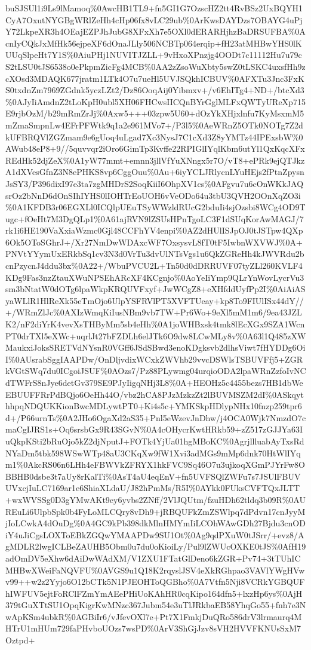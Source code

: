 \documentclass[]{article}
\begin{document}
buSJSUl1i9Ls9lMamoq\%0AwcHB1TL9+fn5GI1G7OzscHZ2tt4RvBSz2UxBQYH1CyA7OxutNYGBgWRlZeHh4cHp06fx8vLC29ub\%0ArKwsDAYDzs7OBAYG4uPjY72LkpeXR3h4OEajEZPJhJubG8XFxXh7e5OXl0dERARHjhzBaDRSUFBA\%0AcnIyCQkJxMfHk56ejpeXF6dOnaJLly506NCBTp064erqip+fH23atMHBwYHS0lKUUqSlpeHt7Y1S\%0AiuPHj1NUVITJZLL+9vHxoXPnzjg4OODt7c11112Hu7u79cS2tLSU0tJS6538o0ePkpmZicFg4MCB\%0AA2zZsoWuXbty5swZ0tLSKC4uxsfHh9zcXOsd3MDAQK677jratm1LTk4O7u7ueHl5UVJSQkhICBUV\%0AFXTu3Jnc3FxKS0txdnZm7969ZGdnk5yczLZt2/Dz86OoqAij0Yibmxv+/v6EhITg4+ND+/btcXd3\%0AJyIiAmdnZ2tLoKpH0ubl5XH06FHCwsIICQnBYrGglMLFxQWTyUReXp715E9rjbOzM/b29mRmZrJj\%0Axw5+++03zpw5U60+dOzYkXHjxlnfu7KyMsxmM5mZmaSmpnLw4EFrPFWtk9q1a2e961MVo7+/P3l5\%0AeWRnZ5OTk0NOTg7Z2dkUFBRQVlZGZmam9e6gUoq4uLgad7Xc3NysJ7C1cXd3Z8yYMTz44IPExsbW\%0AWub48eP8+9//5quvvqr2iOro6GimTp3Kvffe22RPIGlIYqlKbm6utYl1QxKqcXFxREdHk52djZeX\%0A1yW77mmt+emnn3jllVfYuXNngx5r7O/vT8+ePRk9ejQTJkzA1dXVesGfnZ3N8ePHKS8vp6CggOuu\%0Au+6iyYCLJRlycnLYuHEjs2fPtnZpysnJsSY3/P396dixI97e3ta7zgMHDrS2SoqKiiI6OhpXV1cs\%0AFgvu7u6cOnWKkJAQsrOz2bNnD6dOnSIhIYHS0lIOHTrEoUOH6vVeODo64u3tbU3QVH2OOnXqZO3i\%0A1KFDB3r06EGXLl0ICQlpUEuTSyWWzldRUcG2bduIi4sjOzsbi8WCg4OD9Tugc+fOeHt7M3DgQLp1\%0A61ajRVN9lZSUsHPnTgoLC3F1dSUqKorAwMAGJ/7rk1i6HE190VaXxiaWzmc0Gjl48CCFhYV4enpi\%0AZ2dHUlISJpOJ0tJSTpw4QXp6Ok5OToSGhrJ+/Xr27NmDwWDAxcWF7OxsysvL8fT0tF5IwbnWXVWJ\%0A+PNVtYYymUxERkbSq1cv3N3d0VrTu3dvUlNTsVgs1u6QkZGReHh4kJWVRdu2bcnPzycnJ4ddu3bx\%0A22+/WbuPVCU2L+Tn50d0dDRRUVF07tyZLl260KVLF4KDg9Fas3nzZtauXWuNPSEhARcXF4KCgnjo\%0AoYeIiYmp9QLrYnWovLycrVu3sm3bNtatW0dOTg6lpaWkpKRQUVFxyf+JwWCgZ8+eXHfddUyfPp2I\%0AiAiASyaWLlR1HlReXk55eTmOjo6UlpYSFRVlPT5XVFTUeay+kp8To9FIUlISx44dY//+/WRmZlJc\%0AXIzWmqKiIusNBm9vb7TW+Pr6Wo+9eXl5mM1m6/9ea43JZLK2/nF2diYrK4vevXsTHByMm5sb4eHh\%0A1joWHBxsk4tmk8lEcXGx9SZA1WcnPT0drTXl5eXWc+uqrlJt27bFZDLh6elJTk6O9dw8LCwMLy8v\%0A63l1Q485zXWMaukxiJoksSRETVdNYsnR0VGff6JSdSBwd3enoKDgksvb2dlhsViwt7fHYDDg6OiI\%0AUsrabSggIAAPDw/OnDljvdixWCxkZWVhb29vvcDSWlsTSBUVFfj5+ZGRkVGtSWq7du0ICgoiJSUF\%0AOzs7/Pz88PLywmg04urqioODA2lpaWRnZzfoIvNCdTWFrS8nJye6detGv379SE9PJyIigqNHj3L8\%0A+HEOHz5c4455bezs7HB1dbWeEBUUFFRrPdBQjo6OeHh44O/vbz2hCA8PJzMzkzZt2lBUVMSZM2dI\%0ASkqythhpqNDQUKKionBwcMDLywtPT0+Ki4s5c+YMKSkpHDlypNHx10fnzp259tpr6d+/P66urnTs\%0A2JHo6OgaXd2aS35+Pnl5eWzevJnDhw/j4OCA0Wjk7NmzdO7cmaCgIJRS1s+Oq6srsbGx9R43SGvN\%0A4cOHycrKwtHRkb59+zZ517zGJJYa63IuQkpKSti2bRuOjo5kZ2djNputJ+FOTk4YjUa01hgMBoKC\%0AgrjllluabAyTxsRdNYaDm5tbk598WSwWTp48aU3CKqXw9fW1Xvi3adMGs9mMp6dnk70HtWlIYqm1\%0AkcRS06n6LHh4eFBWVkZFRYX1hkFVC9Sq46O7u3ujkoqXGmPJYrFw8OBBHB0dsbe3t7aUy8rKalTi\%0AsT4aU4eqEnV+fn5UVFSQlZWFu7s7JSUlFBUVUVxcjIuLC7169ar1e6ShiaXLdaU/J82hPmMs/R5I\%0AYkk0FUksCVFTQxJLTT+wxWVSSg0D3gYMwAKt9ey6yvbs2ZNff/2VlJQUtm/fzuHDh62tldq3b09R\%0AUREuLi6UlpbSpk0b4FyLoMLCQry8vDh9+jRBQUFkZmZSWlpq7dPdvn17cnJyyMjIoLCwkA4dOuDg\%0A4GC9kPb398dkMlnHMYmIiLCOhWAwGDh27Bjdu3cnODiY4uJiCgsLOXToEBkZGQwYMAAPDw9SU1Ot\%0Ag9qdPXuW0tJSrr/+evz8/AgMDLR2lwgICLBeZAUHB5Obm0u7du0oKioiLy/Pul9lZWUcOXKE0tJS\%0AfH19adOmDV5eXhw6dAiDwWAdXM/V1ZXU1FTatGlDeno6kZGR+Pv74+3tTUhICMHBwXWeiFaNQVFU\%0AVGS9u1Q18K2rqyslJSV4eXkRGhpao3VAVlYWgHVwv99++w2z2Yyjo6O12bCTk5N1PJEOHToQGBho\%0A7Vtfn5Nji8VCRkYGBQUFhIWFUV5ejtFoRClFZmYmAEePHiUoKAhHR0cqKipo164dfn5+lxzHp6ys\%0AjH379tGuXTtSU1OpqKigrKwMNzc367Jubm54e3uTlJRkbaEB58YhqGo55+fnh7e3NwApKSm4ubkR\%0AGBiIr6/vJfevOXl7e+Pt7X1FmkjDuQRo586drV3lrmaurq4MHTrU1mHUm729faPHvboUOzs7wsPD\%0ArV3ShGjJzv8sVH2HVVFKNUsSxM7Oztpd+
\end{document}
